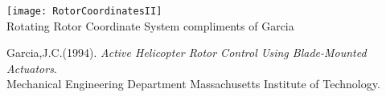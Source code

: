 \documentclass[paper=a4, fontsize=11pt]{scrartcl} %
\numberwithin{equation}{section} %
\numberwithin{figure}{section} %
\numberwithin{table}{section} %
\begin{document}
\begin{section}
		\begin{center}
		  \texttt{[image: RotorCoordinatesII]}\\
		  {Rotating Rotor Coordinate System compliments of Garcia \cite{Garcia}}
		  \label{RotorCoordinatesII:RotorCoordinateSystem2}
		\end{center}
	
	
	\newpage
	\begin{thebibliography}{9}
	Garcia,J.C.(1994). \textit{Active Helicopter Rotor Control Using Blade-Mounted Actuators}.\\ Mechanical Engineering Department Massachusetts Institute of Technology.  
	\end{thebibliography}
	
\end{section}
\end{document}
